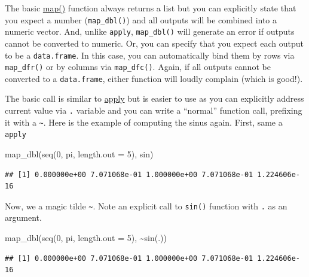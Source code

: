 \documentclass[
]{book}
\newenvironment{Shaded}{\begin{snugshade}}{\end{snugshade}}
\newcommand{\AttributeTok}[1]{\textcolor[rgb]{0.77,0.63,0.00}{#1}}
\newcommand{\DecValTok}[1]{\textcolor[rgb]{0.00,0.00,0.81}{#1}}
\newcommand{\FunctionTok}[1]{\textcolor[rgb]{0.00,0.00,0.00}{#1}}
\newcommand{\NormalTok}[1]{#1}
\newcommand{\SpecialCharTok}[1]{\textcolor[rgb]{0.00,0.00,0.00}{#1}}
\begin{document}
The basic \href{https://purrr.tidyverse.org/reference/map.html}{map()} function always returns a list but you can explicitly state that you expect a number (\texttt{map\_dbl()}) and all outputs will be combined into a numeric vector. And, unlike \texttt{apply}, \texttt{map\_dbl()} will generate an error if outputs cannot be converted to numeric. Or, you can specify that you expect each output to be a \texttt{data.frame}. In this case, you can automatically bind them by rows via \texttt{map\_dfr()} or by columns via \texttt{map\_dfc()}. Again, if all outputs cannot be converted to a \texttt{data.frame}, either function will loudly complain (which is good!).

The basic call is similar to \protect\hyperlink{apply}{apply} but is easier to use as you can explicitly address current value via \texttt{.} variable and you can write a ``normal'' function call, prefixing it with a \texttt{\textasciitilde{}}. Here is the example of computing the sinus again. First, same a \texttt{apply}

\begin{Shaded}
\begin{Highlighting}[]
\FunctionTok{map\_dbl}\NormalTok{(}\FunctionTok{seq}\NormalTok{(}\DecValTok{0}\NormalTok{, pi, }\AttributeTok{length.out =} \DecValTok{5}\NormalTok{), sin)}
\end{Highlighting}
\end{Shaded}

\begin{verbatim}
## [1] 0.000000e+00 7.071068e-01 1.000000e+00 7.071068e-01 1.224606e-16
\end{verbatim}

Now, we a magic tilde \texttt{\textasciitilde{}}. Note an explicit call to \texttt{sin()} function with \texttt{.} as an argument.

\begin{Shaded}
\begin{Highlighting}[]
\FunctionTok{map\_dbl}\NormalTok{(}\FunctionTok{seq}\NormalTok{(}\DecValTok{0}\NormalTok{, pi, }\AttributeTok{length.out =} \DecValTok{5}\NormalTok{), }\SpecialCharTok{\textasciitilde{}}\FunctionTok{sin}\NormalTok{(.))}
\end{Highlighting}
\end{Shaded}

\begin{verbatim}
## [1] 0.000000e+00 7.071068e-01 1.000000e+00 7.071068e-01 1.224606e-16
\end{verbatim}
\end{document}
